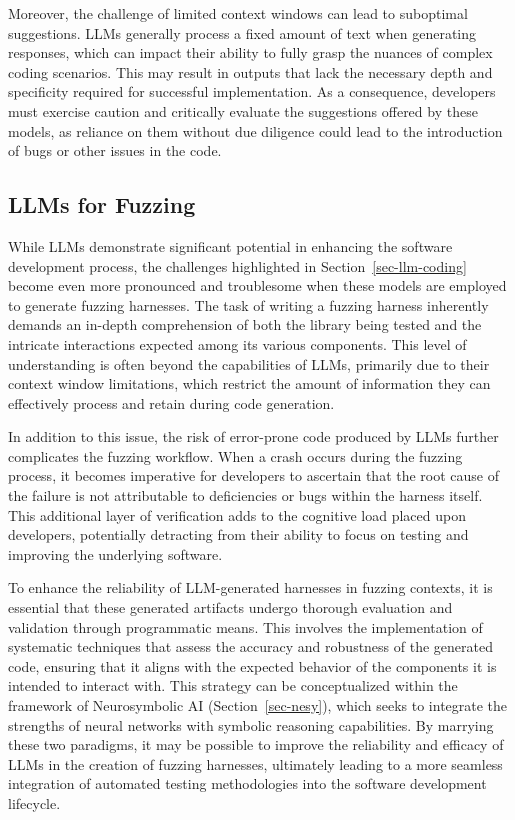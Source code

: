 \documentclass[
  a4paper,
]{scrreprt}
\theoremstyle{definition}
\theoremstyle{remark}
\begin{document}
Moreover, the challenge of limited context windows can lead to
suboptimal suggestions. LLMs generally process a fixed amount of text
when generating responses, which can impact their ability to fully grasp
the nuances of complex coding scenarios. This may result in outputs that
lack the necessary depth and specificity required for successful
implementation. As a consequence, developers must exercise caution and
critically evaluate the suggestions offered by these models, as reliance
on them without due diligence could lead to the introduction of bugs or
other issues in the code.

\subsection{LLMs for Fuzzing}\label{llms-for-fuzzing}

While LLMs demonstrate significant potential in enhancing the software
development process, the challenges highlighted in
Section~\ref{sec-llm-coding} become even more pronounced and troublesome
when these models are employed to generate fuzzing harnesses. The task
of writing a fuzzing harness inherently demands an in-depth
comprehension of both the library being tested and the intricate
interactions expected among its various components. This level of
understanding is often beyond the capabilities of LLMs, primarily due to
their context window limitations, which restrict the amount of
information they can effectively process and retain during code
generation.

In addition to this issue, the risk of error-prone code produced by LLMs
further complicates the fuzzing workflow. When a crash occurs during the
fuzzing process, it becomes imperative for developers to ascertain that
the root cause of the failure is not attributable to deficiencies or
bugs within the harness itself. This additional layer of verification
adds to the cognitive load placed upon developers, potentially
detracting from their ability to focus on testing and improving the
underlying software.

To enhance the reliability of LLM-generated harnesses in fuzzing
contexts, it is essential that these generated artifacts undergo
thorough evaluation and validation through programmatic means. This
involves the implementation of systematic techniques that assess the
accuracy and robustness of the generated code, ensuring that it aligns
with the expected behavior of the components it is intended to interact
with. This strategy can be conceptualized within the framework of
Neurosymbolic AI (Section~\ref{sec-nesy}), which seeks to integrate the
strengths of neural networks with symbolic reasoning capabilities. By
marrying these two paradigms, it may be possible to improve the
reliability and efficacy of LLMs in the creation of fuzzing harnesses,
ultimately leading to a more seamless integration of automated testing
methodologies into the software development lifecycle.
\end{document}
